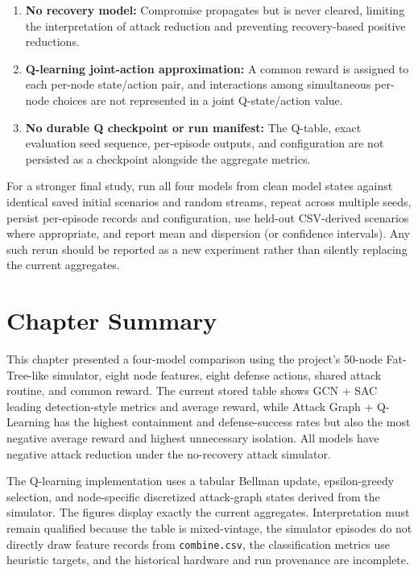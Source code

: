 \documentclass[12pt,a4paper]{report}
\newcommand{\code}[1]{\texttt{#1}}
\begin{document}
\begin{enumerate}[leftmargin=2em,label=\arabic*.]
  \item \textbf{No recovery model:} Compromise propagates but is never cleared, limiting the interpretation of attack reduction and preventing recovery-based positive reductions.
  \item \textbf{Q-learning joint-action approximation:} A common reward is assigned to each per-node state/action pair, and interactions among simultaneous per-node choices are not represented in a joint Q-state/action value.
  \item \textbf{No durable Q checkpoint or run manifest:} The Q-table, exact evaluation seed sequence, per-episode outputs, and configuration are not persisted as a checkpoint alongside the aggregate metrics.
\end{enumerate}

For a stronger final study, run all four models from clean model states against identical saved initial scenarios and random streams, repeat across multiple seeds, persist per-episode records and configuration, use held-out CSV-derived scenarios where appropriate, and report mean and dispersion (or confidence intervals). Any such rerun should be reported as a new experiment rather than silently replacing the current aggregates.

\section{Chapter Summary}

This chapter presented a four-model comparison using the project's 50-node Fat-Tree-like simulator, eight node features, eight defense actions, shared attack routine, and common reward. The current stored table shows GCN + SAC leading detection-style metrics and average reward, while Attack Graph + Q-Learning has the highest containment and defense-success rates but also the most negative average reward and highest unnecessary isolation. All models have negative attack reduction under the no-recovery attack simulator.

The Q-learning implementation uses a tabular Bellman update, epsilon-greedy selection, and node-specific discretized attack-graph states derived from the simulator. The figures display exactly the current aggregates. Interpretation must remain qualified because the table is mixed-vintage, the simulator episodes do not directly draw feature records from \code{combine.csv}, the classification metrics use heuristic targets, and the historical hardware and run provenance are incomplete.
\end{document}
